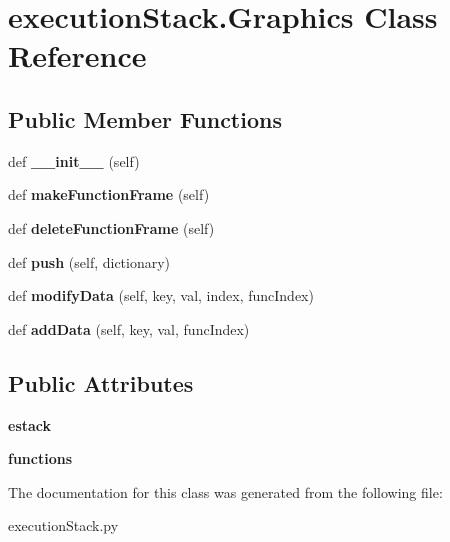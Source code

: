 \hypertarget{classexecution_stack_1_1_graphics}{}\section{execution\+Stack.\+Graphics Class Reference}
\label{classexecution_stack_1_1_graphics}
\subsection*{Public Member Functions}
\begin{DoxyCompactItemize}
\item 
\mbox{\label{classexecution_stack_1_1_graphics_acf9ace0155ce0c9f9865ed83ad834ece}} 
def {\bfseries \+\_\+\+\_\+init\+\_\+\+\_\+} (self)
\item 
\mbox{\label{classexecution_stack_1_1_graphics_ae2d3817297524a7f62cdb500501bd33f}} 
def {\bfseries make\+Function\+Frame} (self)
\item 
\mbox{\label{classexecution_stack_1_1_graphics_a8da37c457e222b7f131f4c25acd08c56}} 
def {\bfseries delete\+Function\+Frame} (self)
\item 
\mbox{\label{classexecution_stack_1_1_graphics_a455991c3f35dc6c47973a8183f3a06e4}} 
def {\bfseries push} (self, dictionary)
\item 
\mbox{\label{classexecution_stack_1_1_graphics_a5b793f6f5577abbfdec7b202875db391}} 
def {\bfseries modify\+Data} (self, key, val, index, func\+Index)
\item 
\mbox{\label{classexecution_stack_1_1_graphics_a02a8347895b7cbb48506e29dfd12f56a}} 
def {\bfseries add\+Data} (self, key, val, func\+Index)
\end{DoxyCompactItemize}
\subsection*{Public Attributes}
\begin{DoxyCompactItemize}
\item 
\mbox{\label{classexecution_stack_1_1_graphics_a8cb32cead44e14bef2b68ce5d5b4a775}} 
{\bfseries estack}
\item 
\mbox{\label{classexecution_stack_1_1_graphics_a7390c53c977fb6f992bbd59d106a014d}} 
{\bfseries functions}
\end{DoxyCompactItemize}


The documentation for this class was generated from the following file\+:\begin{DoxyCompactItemize}
\item 
execution\+Stack.\+py\end{DoxyCompactItemize}
